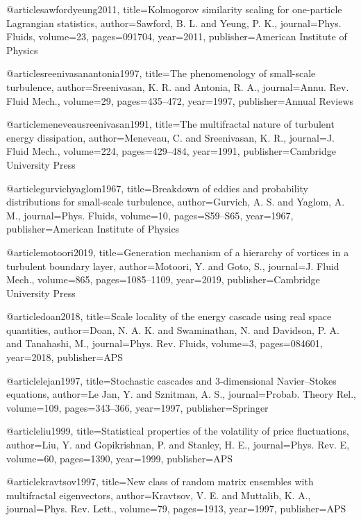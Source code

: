@article{sawfordyeung2011,
  title={{Kolmogorov similarity scaling for one-particle Lagrangian statistics}},
  author={Sawford, B. L. and Yeung, P. K.},
  journal={Phys. Fluids},
  volume={23},
  pages={091704},
  year={2011},
  publisher={American Institute of Physics}
}

@article{sreenivasanantonia1997,
  title={The phenomenology of small-scale turbulence},
  author={Sreenivasan, K. R. and Antonia, R. A.},
  journal={Annu. Rev. Fluid Mech.},
  volume={29},
  pages={435--472},
  year={1997},
  publisher={Annual Reviews}
}

@article{meneveausreenivasan1991,
  title={The multifractal nature of turbulent energy dissipation},
  author={Meneveau, C. and Sreenivasan, K. R.},
  journal={J. Fluid Mech.},
  volume={224},
  pages={429--484},
  year={1991},
  publisher={Cambridge University Press}
}

@article{gurvichyaglom1967,
  title={Breakdown of eddies and probability distributions for small-scale turbulence},
  author={Gurvich, A. S. and Yaglom, A. M.},
  journal={Phys. Fluids},
  volume={10},
  pages={S59--S65},
  year={1967},
  publisher={American Institute of Physics}
}

@article{motoori2019,
  title={Generation mechanism of a hierarchy of vortices in a turbulent boundary layer},
  author={Motoori, Y. and Goto, S.},
  journal={J. Fluid Mech.},
  volume={865},
  pages={1085--1109},
  year={2019},
  publisher={Cambridge University Press}
}

@article{doan2018,
  title={Scale locality of the energy cascade using real space quantities},
  author={Doan, N. A. K. and Swaminathan, N. and Davidson, P. A. and Tanahashi, M.},
  journal={Phys. Rev. Fluids},
  volume={3},
  pages={084601},
  year={2018},
  publisher={APS}
}

@article{lejan1997,
  title={Stochastic cascades and 3-dimensional Navier--Stokes equations},
  author={Le Jan, Y. and Sznitman, A. S.},
  journal={Probab. Theory Rel.},
  volume={109},
  pages={343--366},
  year={1997},
  publisher={Springer}
}

@article{liu1999,
  title={Statistical properties of the volatility of price fluctuations},
  author={Liu, Y. and Gopikrishnan, P. and Stanley, H. E.},
  journal={Phys. Rev. E},
  volume={60},
  pages={1390},
  year={1999},
  publisher={APS}
}

@article{kravtsov1997,
  title={New class of random matrix ensembles with multifractal eigenvectors},
  author={Kravtsov, V. E. and Muttalib, K. A.},
  journal={Phys. Rev. Lett.},
  volume={79},
  pages={1913},
  year={1997},
  publisher={APS}
}

